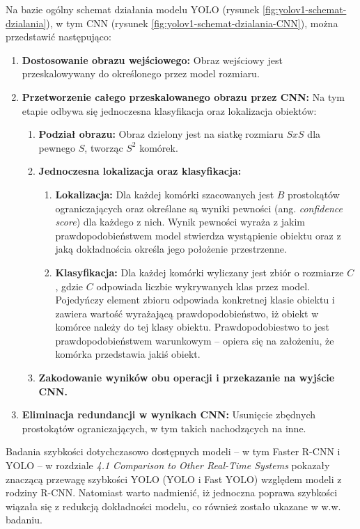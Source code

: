 Na bazie \cite{yolo_pierwszy_artykul} ogólny schemat działania modelu YOLO (rysunek \ref{fig:yolov1-schemat-dzialania}), w tym CNN (rysunek \ref{fig:yolov1-schemat-dzialania-CNN}), można przedstawić następująco:
\begin{enumerate}
    \item \textbf{Dostosowanie obrazu wejściowego:} Obraz wejściowy jest przeskalowywany do określonego przez model rozmiaru.
    \item \textbf{Przetworzenie całego przeskalowanego obrazu przez CNN:} Na tym etapie odbywa się jednoczesna klasyfikacja oraz lokalizacja obiektów:
    \begin{enumerate}
        \item \textbf{Podział obrazu:} Obraz dzielony jest na siatkę rozmiaru $SxS$ dla pewnego $S$, tworząc $S^{2}$ komórek. 
        \item \textbf{Jednoczesna lokalizacja oraz klasyfikacja:} 
        \begin{enumerate}
            \item \textbf{Lokalizacja:} Dla każdej komórki szacowanych jest $B$ prostokątów ograniczających oraz określane są wyniki pewności (ang. \emph{confidence score}) dla każdego z nich. Wynik pewności wyraża z jakim prawdopodobieństwem model stwierdza wystąpienie obiektu oraz z jaką dokładnościa określa jego położenie przestrzenne.
            \item \textbf{Klasyfikacja:} Dla każdej komórki wyliczany jest zbiór o rozmiarze $C$, gdzie $C$ odpowiada liczbie wykrywanych klas przez model. Pojedyńczy element zbioru odpowiada konkretnej klasie obiektu i zawiera wartość wyrażającą prawdopodobieństwo, iż obiekt w komórce należy do tej klasy obiektu. Prawdopodobiestwo to jest prawdopodobieństwem warunkowym -- opiera się na założeniu, że komórka przedstawia jakiś obiekt. 
        \end{enumerate}
        \item \textbf{Zakodowanie wyników obu operacji i przekazanie na wyjście CNN.}
    \end{enumerate}
    \item  \textbf{Eliminacja redundancji w wynikach CNN:} Usunięcie zbędnych prostokątów ograniczających, w tym takich nachodzących na inne. 
\end{enumerate}

Badania szybkości dotychczasowo dostępnych modeli -- w tym Faster R-CNN i YOLO -- w rozdziale \emph{4.1 Comparison to Other Real-Time Systems} \cite{yolo_pierwszy_artykul} pokazały znaczącą przewagę szybkości YOLO (YOLO i Fast YOLO) względem modeli z rodziny R-CNN. Natomiast warto nadmienić, iż jednoczna poprawa szybkości wiązała się z redukcją dokładności modelu, co również zostało ukazane w w.w. badaniu.

